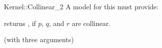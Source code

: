 \begin{ccRefFunctionObjectConcept}{Kernel::Collinear_2}
A model for this must provide:


{returns , if $p$, $q$, and $r$ are collinear.}

\ccRefines
{} (with three arguments)

\ccSeeAlso
{} \\

\end{ccRefFunctionObjectConcept}
